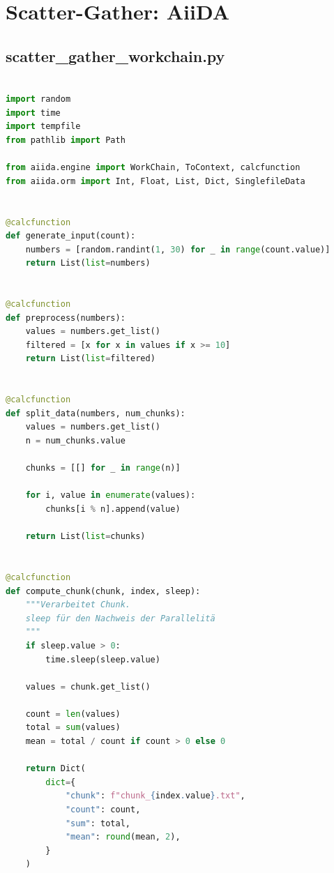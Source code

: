 \chapter{Scatter-Gather: AiiDA}
\label{app:sg:aiida}

\section{scatter\_gather\_workchain.py}
\label{app:sg:aiida:workchain}

\begin{lstlisting}[language=Python,
                   caption={scatter\_gather\_workchain.py: Vollständige WorkChain-Implementierung (AiiDA, Scatter-Gather)},
                   label={lst:app:sg:aiida:workchain}]

import random
import time
import tempfile
from pathlib import Path

from aiida.engine import WorkChain, ToContext, calcfunction
from aiida.orm import Int, Float, List, Dict, SinglefileData


@calcfunction
def generate_input(count):
    numbers = [random.randint(1, 30) for _ in range(count.value)]
    return List(list=numbers)


@calcfunction
def preprocess(numbers):
    values = numbers.get_list()
    filtered = [x for x in values if x >= 10]
    return List(list=filtered)


@calcfunction
def split_data(numbers, num_chunks):
    values = numbers.get_list()
    n = num_chunks.value

    chunks = [[] for _ in range(n)]

    for i, value in enumerate(values):
        chunks[i % n].append(value)

    return List(list=chunks)


@calcfunction
def compute_chunk(chunk, index, sleep):
    """Verarbeitet Chunk.
    sleep für den Nachweis der Parallelitä
    """
    if sleep.value > 0:
        time.sleep(sleep.value)

    values = chunk.get_list()

    count = len(values)
    total = sum(values)
    mean = total / count if count > 0 else 0

    return Dict(
        dict={
            "chunk": f"chunk_{index.value}.txt",
            "count": count,
            "sum": total,
            "mean": round(mean, 2),
        }
    )



\end{lstlisting}
